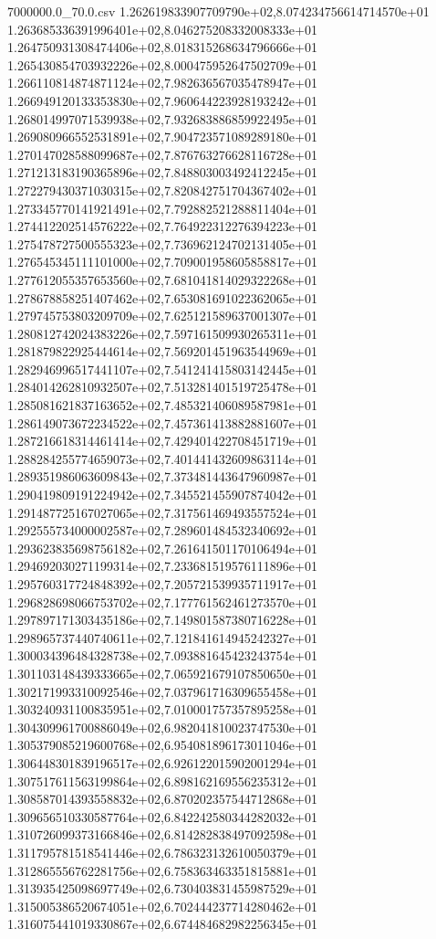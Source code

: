 \begin{filecontents*}{7000000.0_70.0.csv}
1.262619833907709790e+02,8.074234756614714570e+01
1.263685336391996401e+02,8.046275208332008333e+01
1.264750931308474406e+02,8.018315268634796666e+01
1.265430854703932226e+02,8.000475952647502709e+01
1.266110814874871124e+02,7.982636567035478947e+01
1.266949120133353830e+02,7.960644223928193242e+01
1.268014997071539938e+02,7.932683886859922495e+01
1.269080966552531891e+02,7.904723571089289180e+01
1.270147028588099687e+02,7.876763276628116728e+01
1.271213183190365896e+02,7.848803003492412245e+01
1.272279430371030315e+02,7.820842751704367402e+01
1.273345770141921491e+02,7.792882521288811404e+01
1.274412202514576222e+02,7.764922312276394223e+01
1.275478727500555323e+02,7.736962124702131405e+01
1.276545345111101000e+02,7.709001958605858817e+01
1.277612055357653560e+02,7.681041814029322268e+01
1.278678858251407462e+02,7.653081691022362065e+01
1.279745753803209709e+02,7.625121589637001307e+01
1.280812742024383226e+02,7.597161509930265311e+01
1.281879822925444614e+02,7.569201451963544969e+01
1.282946996517441107e+02,7.541241415803142445e+01
1.284014262810932507e+02,7.513281401519725478e+01
1.285081621837163652e+02,7.485321406089587981e+01
1.286149073672234522e+02,7.457361413882881607e+01
1.287216618314461414e+02,7.429401422708451719e+01
1.288284255774659073e+02,7.401441432609863114e+01
1.289351986063609843e+02,7.373481443647960987e+01
1.290419809191224942e+02,7.345521455907874042e+01
1.291487725167027065e+02,7.317561469493557524e+01
1.292555734000002587e+02,7.289601484532340692e+01
1.293623835698756182e+02,7.261641501170106494e+01
1.294692030271199314e+02,7.233681519576111896e+01
1.295760317724848392e+02,7.205721539935711917e+01
1.296828698066753702e+02,7.177761562461273570e+01
1.297897171303435186e+02,7.149801587380716228e+01
1.298965737440740611e+02,7.121841614945242327e+01
1.300034396484328738e+02,7.093881645423243754e+01
1.301103148439333665e+02,7.065921679107850650e+01
1.302171993310092546e+02,7.037961716309655458e+01
1.303240931100835951e+02,7.010001757357895258e+01
1.304309961700886049e+02,6.982041810023747530e+01
1.305379085219600768e+02,6.954081896173011046e+01
1.306448301839196517e+02,6.926122015902001294e+01
1.307517611563199864e+02,6.898162169556235312e+01
1.308587014393558832e+02,6.870202357544712868e+01
1.309656510330587764e+02,6.842242580344282032e+01
1.310726099373166846e+02,6.814282838497092598e+01
1.311795781518541446e+02,6.786323132610050379e+01
1.312865556762281756e+02,6.758363463351815881e+01
1.313935425098697749e+02,6.730403831455987529e+01
1.315005386520674051e+02,6.702444237714280462e+01
1.316075441019330867e+02,6.674484682982256345e+01

\end{filecontents*}
